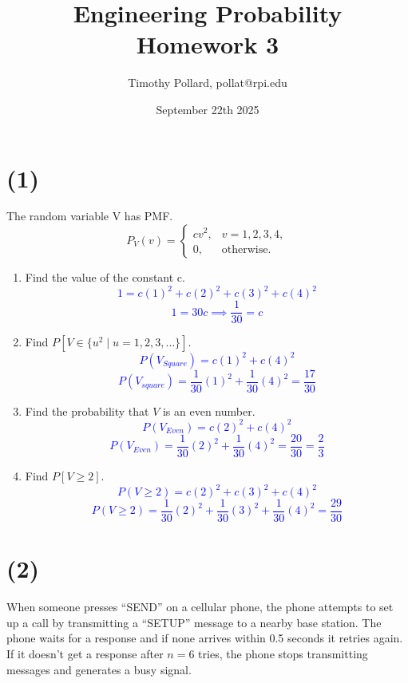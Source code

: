 \documentclass[12pt]{article}
\title{Engineering Probability \\ Homework 3}
\author{Timothy Pollard, pollat@rpi.edu}
\date{September 22th 2025}
\begin{document}
\maketitle
\hrulefill

\section*{(1)}
The random variable V has PMF.
\[
P_V(v) =
\begin{cases}
cv^2, & v = 1,2,3,4, \\
0, & \text{otherwise}.
\end{cases}
\]

\begin{enumerate}
    \item[(a)] Find the value of the constant c. \textcolor{blue}{\[1=c(1)^2+c(2)^2+c(3)^2+c(4)^2 \] \[1=30c \implies \frac{1}{30}=c\]}
    \item[(b)] Find $P\left[V \in \{u^2 \mid u = 1,2,3,\dots \}\right]$. \textcolor{blue}{\[P(V_{Square}) =c(1)^2 +c(4)^2\] \[P(V_{square}) =\frac{1}{30}(1)^2 +\frac{1}{30}(4)^2=\frac{17}{30}\]}
    \item[(c)] Find the probability that $V$ is an even number. \textcolor{blue}{\[P(V_{Even}) = c(2)^2+c(4)^2\] \[P(V_{Even}) = \frac{1}{30}(2)^2+\frac{1}{30}(4)^2 = \frac{20}{30} =\frac{2}{3}\]}
    \item[(d)] Find $P[V\ge 2]$.  \textcolor{blue}{\[P(V\geq 2) = c(2)^2+c(3)^2+c(4)^2\] \[P(V\geq 2) = \frac{1}{30}(2)^2+\frac{1}{30}(3)^2+\frac{1}{30}(4)^2 = \frac{29}{30}\]}
\end{enumerate}

\section*{(2)}
When someone presses “SEND” on a cellular phone, the phone attempts to set
up a call by transmitting a “SETUP” message to a nearby base station. The phone waits
for a response and if none arrives within 0.5 seconds it retries again. If it doesn’t get a
response after $n = 6$ tries, the phone stops transmitting messages and generates a busy
signal.
\end{document}

